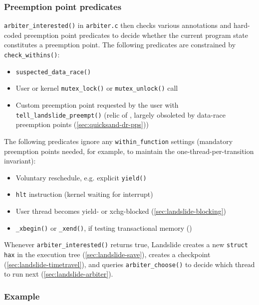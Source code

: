 \subsubsection{Preemption point predicates}

{\tt arbiter\_interested()} in {\tt arbiter.c} then
checks various annotations and hard-coded preemption point predicates
to decide whether the current program state constitutes a preemption point.
The following predicates are constrained by {\tt check\_withins()}:

\begin{itemize}
	\item {\tt suspected\_data\_race()}
	\item User or kernel {\tt mutex\_lock()} or {\tt mutex\_unlock()} call
	\item Custom preemption point requested by the user with {\tt tell\_landslide\_preempt()}
		(relic of \cite{landslide}, largely obsoleted by data-race preemption points (\cref{sec:quicksand-dr-pps}))
\end{itemize}

The following predicates ignore any {\tt within\_function} settings
(mandatory preemption points needed, for example, to maintain the one-thread-per-transition invariant):

\begin{itemize}
	\item Voluntary reschedule, e.g. explicit {\tt yield()}
	\item {\tt hlt} instruction (kernel waiting for interrupt)
	\item User thread becomes yield- or xchg-blocked (\cref{sec:landslide-blocking})
	\item {\tt \_xbegin()} or {\tt \_xend()}, if testing transactional memory ()
\end{itemize}

Whenever {\tt arbiter\_interested()} returns true,
Landslide creates a new {\tt struct hax} in the execution tree (\cref{sec:landslide-save}),
creates a checkpoint (\cref{sec:landslide-timetravel}),
and queries {\tt arbiter\_choose()} to decide which thread to run next (\cref{sec:landslide-arbiter}).

\subsubsection{Example}

